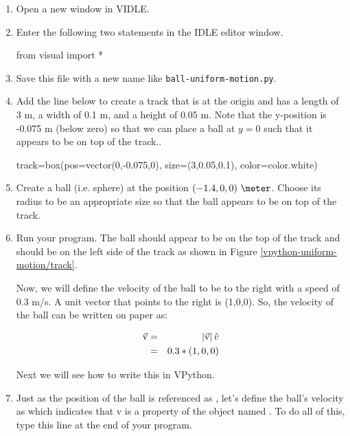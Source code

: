 \begin{enumerate}

	\item Open a new window in VIDLE. 
	
	\item Enter the following two statements in the IDLE editor window.
	
\begin{myvpython}	
from visual import *
\end{myvpython}

\item Save this file with a new name like \texttt{ball-uniform-motion.py}.

\item Add the line below to create a track that is at the origin and has a length of 3 m, a width of 0.1 m, and a height of 0.05 m. Note that the y-position is -0.075 m (below zero) so that we can place a ball at $y=0$ such that it appears to be on top of the track..

\begin{myvpython}
track=box(pos=vector(0,-0.075,0), size=(3,0.05,0.1), color=color.white)
\end{myvpython}

\item Create a ball (i.e. sphere) at the position $(-1.4,0,0)\ \meter$. Choose its radius to be an appropriate size so that the ball appears to be on top of the track.

\item Run your program. The ball should appear to be on the top of the track and should be on the left side of the track as shown in Figure \ref{vpython-uniform-motion/track}.


Now, we will define the velocity of the ball to be to the right with a speed of 0.3 m/s. A unit vector that points to the right is (1,0,0). So, the velocity of the ball can be written on paper as:

\begin{eqnarray*}
	\vec{\mathrm{v}} & = & \left|\vec{\mathrm{v}}\right|\hat{v} \\
	& = & 0.3*(1,0,0) 
\end{eqnarray*} 

Next we will see how to write this in VPython.

\item Just as the position of the ball is referenced as , let's define the ball's velocity as  which indicates that v is a property of the object named .  To do all of this, type this line at the end of your program.
	

\end{enumerate}
